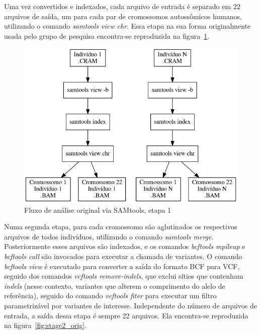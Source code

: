 \documentclass[cic,tc]{iiufrgs}
\begin{document}
{Uma vez convertidos e indexados, cada arquivo de entrada é separado em 22
arquivos de saída, um para cada par de cromossomos autossômicos humanos,
utilizando o comando \textit{samtools view chr}. Essa etapa na sua forma
originalmente usada pelo grupo de pesquisa encontra-se reproduzida na
figura~\ref{fig:stage1_orig}.

\begin{figure}
  \caption{Fluxo de análise original via SAMtools, etapa 1}
    \begin{center}
      \includegraphics[width=0.85\linewidth]{img/stage1_orig.png}
    \end{center}
    \label{fig:stage1_orig}
\end{figure}

Numa segunda etapa, para cada cromossomo são aglutinados os respectivos
arquivos de todos indivíduos, utilizando o comando \textit{samtools merge}.
Posteriormente esses arquivos são indexados, e os comandos \textit{bcftools
mpileup} e \textit{bcftools call} são invocados para executar a chamada de
variantes. O comando \textit{bcftools view} é executado para converter a saída
do formato BCF para VCF, seguido dos comandos \textit{vcftools remove-indels},
que exclui sítios que contenham \textit{indels} (nesse contexto, variantes que
alterem o comprimento do alelo de referência), seguido do comando
\textit{vcftools fiter} para executar um filtro parametrizável por variantes de
interesse. Independente do número de arquivos de entrada, a saída dessa etapa é
sempre 22 arquivos. Ela encontra-se reproduzida na
figura~\ref{fig:stage2_orig}.

}
\end{document}
